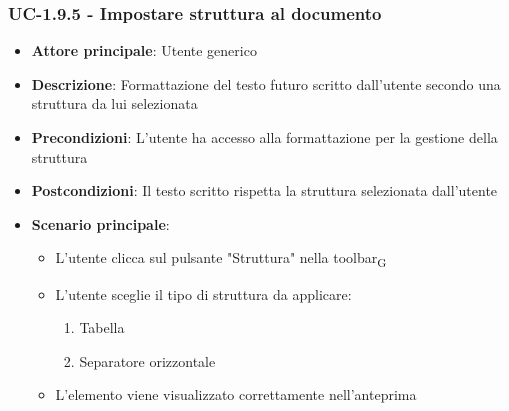 \documentclass[11pt,a4paper]{article}
\newcommand{\gls}[1]{#1\textsubscript{G}}
\begin{document}
\subsubsection{UC-1.9.5 - Impostare struttura al documento}
\begin{itemize}
    \item \textbf{Attore principale}: Utente generico
    \item \textbf{Descrizione}: Formattazione del testo futuro scritto dall’utente secondo una struttura da lui selezionata
    \item \textbf{Precondizioni}: L’utente ha accesso alla formattazione per la gestione della struttura
    \item \textbf{Postcondizioni}: Il testo scritto rispetta la struttura selezionata dall’utente
    \item \textbf{Scenario principale}:
        \begin{itemize}
            \item L’utente clicca sul pulsante "Struttura" nella \gls{toolbar}
            \item L’utente sceglie il tipo di struttura da applicare:
                \begin{enumerate}
                    \item Tabella
                    \item Separatore orizzontale
                \end{enumerate}
            \item L'elemento viene visualizzato correttamente nell'anteprima
        \end{itemize}
\end{itemize}
\end{document}
